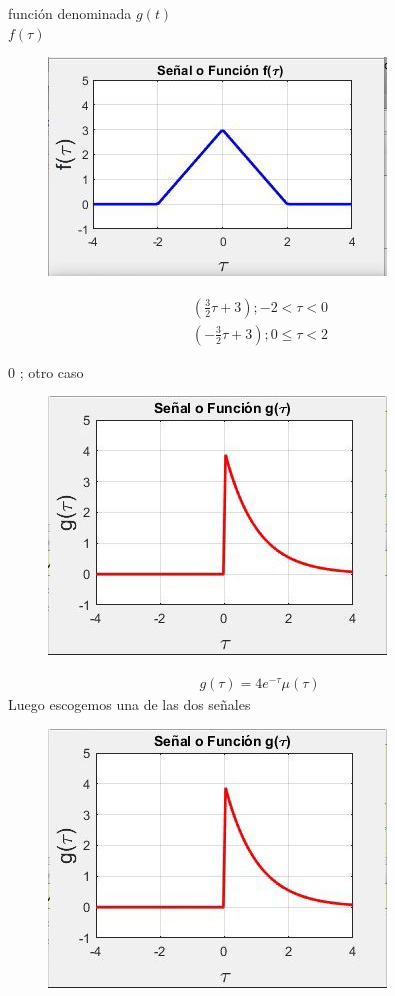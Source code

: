 \documentclass[11pt,letterpaper]{article}
\begin{document}
función denominada $g (t)$\\
$f(\tau)$
\begin{figure} [H]
\includegraphics[scale=0.5]{figura 1}
\end{figure}
\begin{align}
\left( \frac{3}{2}\tau + 3 \right) ; -2 < \tau < 0\\
\left( -\frac{3}{2}\tau + 3 \right) ; 0 \leqslant \tau < 2
\end{align}
\begin{center}
0 ; otro caso
\end{center}
\begin{figure} [H]
\includegraphics[scale=0.5]{figura 2}
\end{figure}
\begin{align}
g(\tau) = 4 e^{-\tau} \mu (\tau)
\end{align}
Luego escogemos una de las dos señales\\
\begin{figure} [H]
\includegraphics[scale=0.5]{figura 2}
\end{figure}
\end{document}
